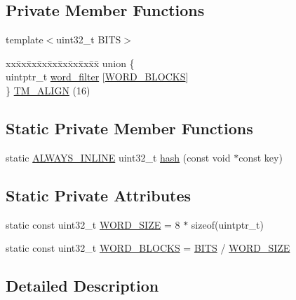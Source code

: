 \subsection*{Private Member Functions}
\begin{DoxyCompactItemize}
\item 
template$<$uint32\-\_\-t B\-I\-T\-S$>$ \begin{tabbing}
xx\=xx\=xx\=xx\=xx\=xx\=xx\=xx\=xx\=\kill
union \{\\
\>uintptr\_t \hyperlink{classstm_1_1BitFilter_a42af71c2d394c0ff906aae9a06913d51}{word\_filter} \mbox{[}\hyperlink{classstm_1_1BitFilter_a7af8cead7398ad88d95b2e6e7a342636}{WORD\_BLOCKS}\mbox{]}\\
\} \hyperlink{classstm_1_1BitFilter_a1fafbb01989244bd3e0bb5998ae7e3e2}{TM\_ALIGN} (16)\\

\end{tabbing}\end{DoxyCompactItemize}
\subsection*{Static Private Member Functions}
\begin{DoxyCompactItemize}
\item 
static \hyperlink{platform_8hpp_aa1dec568e79152c892dcf63f445cbd7a}{A\-L\-W\-A\-Y\-S\-\_\-\-I\-N\-L\-I\-N\-E} uint32\-\_\-t \hyperlink{classstm_1_1BitFilter_aea35b8fb0dfd44b973293452592e3beb}{hash} (const void $\ast$const key)
\end{DoxyCompactItemize}
\subsection*{Static Private Attributes}
\begin{DoxyCompactItemize}
\item 
static const uint32\-\_\-t \hyperlink{classstm_1_1BitFilter_a699d8a0022afba29dc30045a5af8c87f}{W\-O\-R\-D\-\_\-\-S\-I\-Z\-E} = 8 $\ast$ sizeof(uintptr\-\_\-t)
\item 
static const uint32\-\_\-t \hyperlink{classstm_1_1BitFilter_a7af8cead7398ad88d95b2e6e7a342636}{W\-O\-R\-D\-\_\-\-B\-L\-O\-C\-K\-S} = \hyperlink{alg__radix__smp_8c_a3e027e31373b901c1ac291dfad9f89a3}{B\-I\-T\-S} / \hyperlink{classstm_1_1BitFilter_a699d8a0022afba29dc30045a5af8c87f}{W\-O\-R\-D\-\_\-\-S\-I\-Z\-E}
\end{DoxyCompactItemize}


\subsection{Detailed Description}
